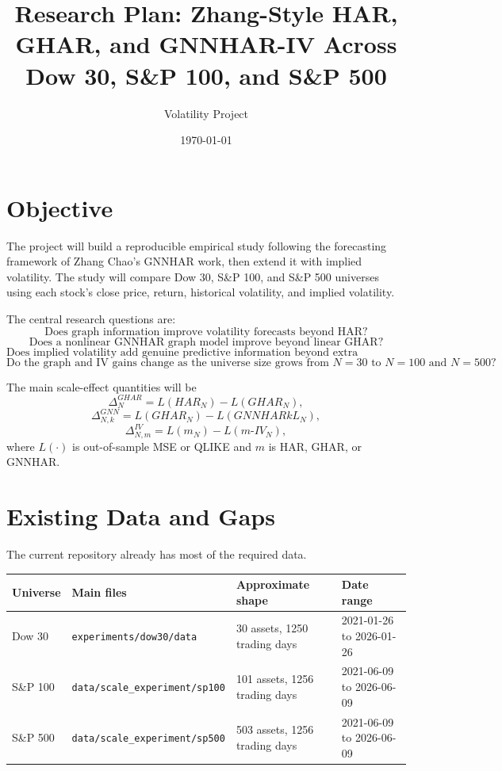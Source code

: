 \documentclass[11pt,a4paper]{article}
\title{Research Plan: Zhang-Style HAR, GHAR, and GNNHAR-IV Across Dow 30, S\&P 100, and S\&P 500}
\author{Volatility Project}
\date{\today}
\begin{document}
\maketitle

\section{Objective}

The project will build a reproducible empirical study following the forecasting framework of Zhang Chao's GNNHAR work, then extend it with implied volatility. The study will compare Dow 30, S\&P 100, and S\&P 500 universes using each stock's close price, return, historical volatility, and implied volatility.

The central research questions are:
\[
\text{Does graph information improve volatility forecasts beyond HAR?}
\]
\[
\text{Does a nonlinear GNNHAR graph model improve beyond linear GHAR?}
\]
\[
\text{Does implied volatility add genuine predictive information beyond extra parameters?}
\]
\[
\text{Do the graph and IV gains change as the universe size grows from } N=30 \text{ to } N=100 \text{ and } N=500?
\]

The main scale-effect quantities will be
\[
\Delta^{GHAR}_{N}=L(HAR_N)-L(GHAR_N),
\]
\[
\Delta^{GNN}_{N,k}=L(GHAR_N)-L(GNNHAR{k}L_N),
\]
\[
\Delta^{IV}_{N,m}=L(m_N)-L(m\text{-}IV_N),
\]
where \(L(\cdot)\) is out-of-sample MSE or QLIKE and \(m\) is HAR, GHAR, or GNNHAR.

\section{Existing Data and Gaps}

The current repository already has most of the required data.

\begin{longtable}{llll}
\toprule
Universe & Main files & Approximate shape & Date range \\
\midrule
\endhead
Dow 30 & \texttt{experiments/dow30/data} & 30 assets, 1250 trading days & 2021-01-26 to 2026-01-26 \\
S\&P 100 & \texttt{data/scale\_experiment/sp100} & 101 assets, 1256 trading days & 2021-06-09 to 2026-06-09 \\
S\&P 500 & \texttt{data/scale\_experiment/sp500} & 503 assets, 1256 trading days & 2021-06-09 to 2026-06-09 \\
\bottomrule
\end{longtable}
\end{document}
